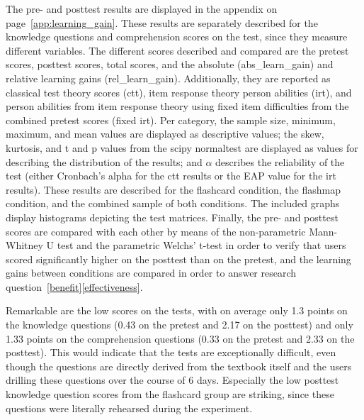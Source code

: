 The pre- and posttest results are displayed in the  appendix on page~\ref{app:learning_gain}. These results are separately described for the knowledge questions and comprehension scores on the test, since they measure different variables. The different scores described and compared are the pretest scores, posttest scores, total scores, and the absolute (abs\_learn\_gain) and relative learning gains (rel\_learn\_gain). Additionally, they are reported as classical test theory scores (ctt), item response theory person abilities (irt), and person abilities from item response theory using fixed item difficulties from the combined pretest scores (fixed irt). Per category, the sample size, minimum, maximum, and mean values are displayed as descriptive values; the skew, kurtosis, and t and p values from the scipy normaltest are displayed as values for describing the distribution of the results; and $\alpha$ describes the reliability of the test (either Cronbach's alpha for the ctt results or the EAP value for the irt results). These results are described for the flashcard condition, the flashmap condition, and the combined sample of both conditions. The included graphs display histograms depicting the test matrices. Finally, the pre- and posttest scores are compared with each other by means of the non-parametric Mann-Whitney U test and the parametric Welchs' t-test in order to verify that users scored significantly higher on the posttest than on the pretest, and the learning gains between conditions are compared in order to answer research question~\ref{benefit}\ref{effectiveness}.

Remarkable are the low scores on the tests, with on average only 1.3 points on the knowledge questions (0.43 on the pretest and 2.17 on the posttest) and only 1.33 points on the comprehension questions (0.33 on the pretest and 2.33 on the posttest). This would indicate that the tests are exceptionally difficult, even though the questions are directly derived from the textbook itself and the users drilling these questions over the course of 6 days. Especially the low posttest knowledge question scores from the flashcard group are striking, since these questions were literally rehearsed during the experiment.

